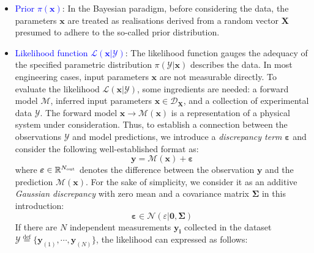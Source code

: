 \begin{itemize}[left=0pt]
    \item \textcolor{blue}{Prior $\pi(\boldsymbol{x})$}: In the Bayesian paradigm, before considering the data, the parameters $\boldsymbol{x}$ are treated as realisations derived from a random vector $\boldsymbol{X}$ presumed to adhere to the so-called prior distribution.


    \item \textcolor{blue}{Likelihood function $\mathcal{L}(\boldsymbol{x}|\mathcal{Y})$}: The likelihood function gauges the adequacy of the specified parametric distribution $\pi(\mathcal{Y}|\boldsymbol{x})$ describes the data. In most engineering cases, input parameters $\boldsymbol{x}$ are not measurable directly. To evaluate the likelihood $\mathcal{L}(\boldsymbol{x}|\mathcal{Y})$, some ingredients are needed: a forward model $\mathcal{M}$, inferred input parameters $\boldsymbol{x} \in\mathcal{D}_{\boldsymbol{X}}$, and a collection of experimental data $\mathcal{Y}$.
The forward model $\boldsymbol{x} \rightarrow \boldsymbol{\mathcal{M}}(\boldsymbol{x})$ is a representation of a physical system under consideration. Thus, to establish a connection between the observations $\mathcal{Y}$ and model predictions, we introduce a \textit{discrepancy term} $\boldsymbol{\varepsilon}$ and consider the following well-established format as:
\begin{equation}
        \label{eq: discrepancy term}
        \boldsymbol{y} = \mathcal{M}(\boldsymbol{x}) + \boldsymbol{\varepsilon}
    \end{equation}
where $\boldsymbol{\varepsilon} \in \mathbb{R}^{N_{\rm{out}}}$ denotes the difference between the observation $\boldsymbol{y}$ and the prediction $\mathcal{M}(\boldsymbol{x})$. For the sake of simplicity, we consider it as an additive \textit{Gaussian discrepancy} with zero mean and a covariance matrix $\boldsymbol{\Sigma}$ in this introduction:
\begin{equation}
            \label{eq: Gaussian discrepancy}
            \boldsymbol{\varepsilon} \in \mathcal{N}(\varepsilon|\boldsymbol{0},\boldsymbol{\Sigma})
        \end{equation}
If there are $N$ independent measurements $\boldsymbol{y_{i}}$ collected in the dataset $\mathcal{Y} \stackrel{\mathrm{def}}{=} \{{\boldsymbol{y}_{(1)}},\cdots,{\boldsymbol{y}_{(N)}}\}$, the likelihood can expressed as follows:
\begin{equation}        
        \label{eq: Likelihood function}
        \begin{aligned}

\end{aligned}
\end{equation}
\end{itemize}
